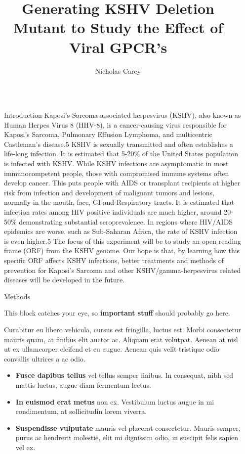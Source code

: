 \documentclass[final]{beamer}
\title{Generating KSHV Deletion Mutant to Study the Effect of Viral GPCR's}
\author{Nicholas Carey \inst{1}}
\institute[shortinst]{\inst{1} UC Berkeley}
\newlength{\sepwidth}
\newlength{\colwidth}
\newcommand{\separatorcolumn}{\begin{column}{\sepwidth}\end{column}}
\begin{document}
\begin{frame}[t]
\begin{columns}[t]
\separatorcolumn

\begin{column}{\colwidth}

  \begin{block}{Introduction}
Kaposi’s Sarcoma associated herpesvirus (KSHV), also known as Human Herpes Virus 8 (HHV-8), is a cancer-causing virus responsible for Kaposi’s Sarcoma, Pulmonary Effusion Lymphoma, and multicentric Castleman’s disease.5 KSHV is sexually transmitted and often establishes a life-long infection. It is estimated that 5-20\% of the United States population is infected with KSHV. While KSHV infections are asymptomatic in most immunocompetent people, those with compromised immune systems often develop cancer. This puts people with AIDS or transplant recipients at higher risk from infection and development of malignant tumors and lesions, normally in the mouth, face, GI and Respiratory tracts.  It is estimated that infection rates among HIV positive individuals are much higher, around 20-50\% demonstrating substantial seroprevalence. In regions where HIV/AIDS epidemics are worse, such as Sub-Saharan Africa, the rate of KSHV infection is even higher.5 The focus of this experiment will be to study an open reading frame (ORF) from the KSHV genome. Our hope is that, by learning how this specific ORF affects KSHV infections, better treatments and methods of prevention for Kaposi’s Sarcoma and other KSHV/gamma-herpesvirus related diseases will be developed in the future. 
  \end{block}

  \begin{alertblock}{Methods}

    This block catches your eye, so \textbf{important stuff} should probably go
    here.

    Curabitur eu libero vehicula, cursus est fringilla, luctus est. Morbi
    consectetur mauris quam, at finibus elit auctor ac. Aliquam erat volutpat.
    Aenean at nisl ut ex ullamcorper eleifend et eu augue. Aenean quis velit
    tristique odio convallis ultrices a ac odio.

    \begin{itemize}
      \item \textbf{Fusce dapibus tellus} vel tellus semper finibus. In
        consequat, nibh sed mattis luctus, augue diam fermentum lectus.
      \item \textbf{In euismod erat metus} non ex. Vestibulum luctus augue in
        mi condimentum, at sollicitudin lorem viverra.
      \item \textbf{Suspendisse vulputate} mauris vel placerat consectetur.
        Mauris semper, purus ac hendrerit molestie, elit mi dignissim odio, in
        suscipit felis sapien vel ex.
    \end{itemize}


\end{alertblock}
\end{column}
\end{columns}
\end{frame}
\end{document}
